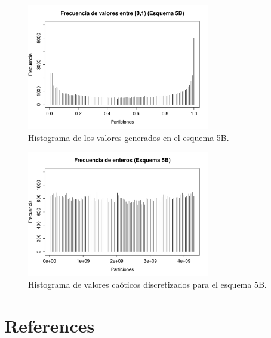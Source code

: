 \documentclass[preprint]{elsarticle}
\begin{document}
\begin{figure}[H]  
\centering
\includegraphics[width=8cm]{fbl.pdf}
\caption{Histograma de los valores generados en el esquema 5B.}
\label{fbl}
\end{figure}


\begin{figure}[H]
\centering
\includegraphics[width=8cm]{fbd.pdf}
\caption{Histograma de valores caóticos discretizados para el esquema 5B.}
\label{fbd}
\end{figure}








\section*{References}


\end{document}
